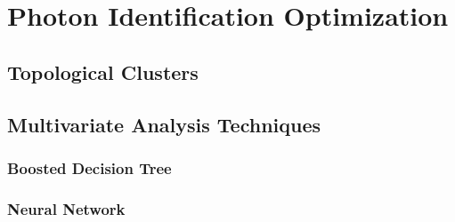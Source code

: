 \chapter{Photon Identification Optimization}
\section{Topological Clusters}
\section{Multivariate Analysis Techniques}
\subsection{Boosted Decision Tree}
\subsection{Neural Network}